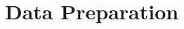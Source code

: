 \documentclass[preparation.tex]{subfiles}
\begin{document}
\section{Data Preparation} %
\label{sec:preparation}

\end{document}
